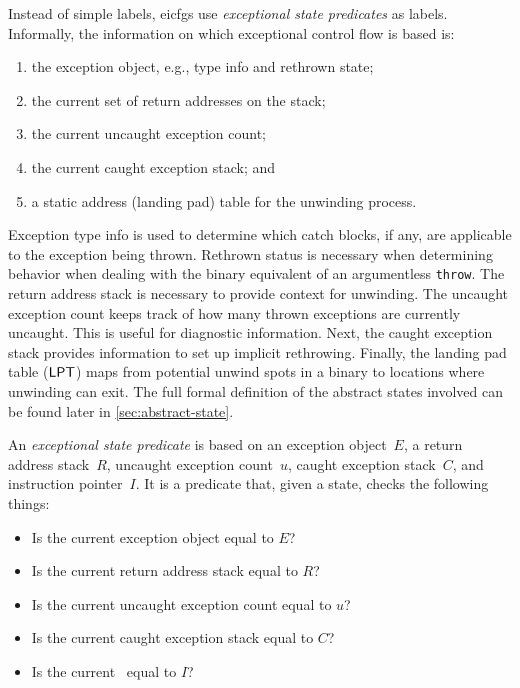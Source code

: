 Instead of simple labels, \glspl{eicfg} use \emph{exceptional state predicates} as labels.
Informally, the information on which exceptional control flow is based is:
\begin{enumerate}
  \item the exception object, e.g., type info and rethrown state;
  \item the current set of return addresses on the stack;
  \item the current uncaught exception count;
  \item the current caught exception stack; and
  \item a static address (landing pad) table for the unwinding process.
\end{enumerate}
Exception type info is used to determine which catch blocks, if any, are applicable to the exception being thrown.
Rethrown status is necessary when determining behavior when dealing with the binary equivalent of an argumentless \lstinline|throw|.
The return address stack is necessary to provide context for unwinding.
The uncaught exception count keeps track of how many thrown exceptions are currently uncaught.
This is useful for diagnostic information.
Next, the caught exception stack provides information to set up implicit rethrowing.
Finally, the landing pad table ($\operatorname{\mathsf{LPT}}$) maps from potential unwind spots in a binary to locations where unwinding can exit.
The full formal definition of the abstract states involved can be found later in \cref{sec:abstract-state}.

\begin{definition}
  An \emph{exceptional state predicate} is based on an exception object~$E$, a return address stack~$R$, uncaught exception count~$u$, caught exception stack~$C$, and instruction pointer~$I$.
  It is a predicate that, given a state, checks the following things:
  \begin{itemize}
    \item Is the current exception object equal to $E$?
    \item Is the current return address stack equal to $R$?
    \item Is the current uncaught exception count equal to $u$?
    \item Is the current caught exception stack equal to $C$?
    \item Is the current \rip\ equal to $I$?
  \end{itemize}
\end{definition}

